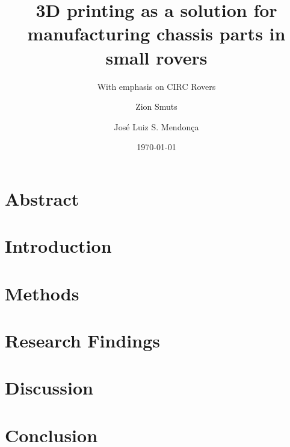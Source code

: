 \documentclass{scrartcl}
\title{3D printing as a solution for manufacturing chassis parts in small rovers}
\subtitle{With emphasis on CIRC Rovers}
\author{Zion Smuts}
\author{José Luiz S. Mendonça}
\date{\today}
\begin{document}
	
	\maketitle
	\tableofcontents

	\clearpage

	\section{Abstract}
	\section{Introduction}
	\section{Methods}
	\section{Research Findings}
	\section{Discussion}
	\section{Conclusion}
	
		

	
\end{document}

